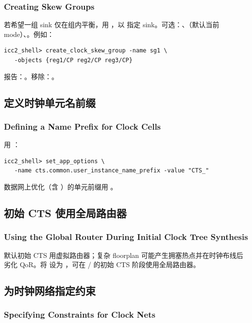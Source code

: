 \subsubsection*{Creating Skew Groups}

若希望一组 sink 仅在组内平衡，用 ，以  指定 sink。可选：、（默认当前 mode）、。例如：
\begin{lstlisting}
icc2_shell> create_clock_skew_group -name sg1 \
   -objects {reg1/CP reg2/CP reg3/CP}
\end{lstlisting}
报告：。移除：。

\subsection{定义时钟单元名前缀}
\subsubsection*{Defining a Name Prefix for Clock Cells}

用 ：
\begin{lstlisting}
icc2_shell> set_app_options \
   -name cts.common.user_instance_name_prefix -value "CTS_"
\end{lstlisting}
数据网上优化（含 \cmd{clock\_opt}）的单元前缀用 。

\subsection{初始 CTS 使用全局路由器}
\subsubsection*{Using the Global Router During Initial Clock Tree Synthesis}

默认初始 CTS 用虚拟路由器；复杂 floorplan 可能产生拥塞热点并在时钟布线后劣化 QoR。将  设为 ，可在 / 的初始 CTS 阶段使用全局路由器。

\subsection{为时钟网络指定约束}
\subsubsection*{Specifying Constraints for Clock Nets}

